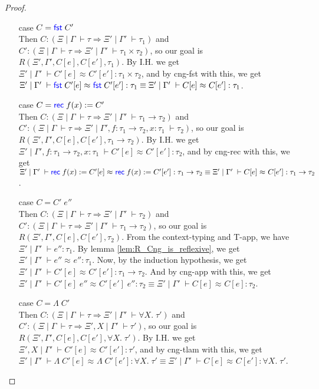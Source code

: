 \documentclass[twoside,11pt,openright]{report}
\theoremstyle{definition}
\newcommand{\Keyword}[1]{{\color{blue} \mathsf{#1}}}
\newcommand{\var}{x}
\newcommand{\expr}{e}
\newcommand{\Fst}{\Keyword{fst}\;}
\newcommand{\Tvar}{X}
\newcommand{\Tlam}{\Lambda\;}
\newcommand{\ctx}{C}
\newcommand{\Tprod}[2]{#1 \times #2}
\newcommand{\Tfunc}[2]{#1 \rightarrow #2}
\newcommand{\Tall}[2]{\forall #1.\; #2}
\newcommand{\typ}{\tau}
\newcommand{\venv}{\Gamma}
\newcommand{\tenv}{\Xi}
\newcommand{\jdg}[4]{#1 \; | \; #2 \; \vdash #3 : #4}
\newcommand{\jdgType}[3]{#1 \; | \; #2 \; \vdash #3}
\newcommand{\jdgRel}[6]{#1 \; | \; #2 \; \vdash #3 \approx^{#4} #5 : #6}
\begin{document}
\begin{proof}
\begin{itemize}
    \item[case] $\ctx = \Fst \ctx'$\\
      Then $\ctx : (\jdgType{\tenv}{\venv}{\typ} \Rightarrow \jdgType{\tenv'}{\venv'}{\typ_1})$ and $\ctx' : (\jdgType{\tenv}{\venv}{\typ} \Rightarrow \jdgType{\tenv'}{\venv'}{\Tprod{\typ_1}{\typ_2}})$, so our goal is $R(\tenv', \venv', \ctx[\expr], \ctx[\expr'], \typ_1)$. By I.H. we get $\jdgRel{\tenv'}{\venv'}{\ctx'[\expr]}{}{\ctx'[\expr']}{\Tprod{\typ_1}{\typ_2}}$, and by cng-fst with this, we get $\jdgRel{\tenv'}{\venv'}{\Fst \ctx'[\expr]}{}{\Fst \ctx'[\expr']}{\typ_1} \equiv \jdgRel{\tenv'}{\venv'}{\ctx[\expr]}{}{\ctx[\expr']}{\typ_1}$.
    \item[case] $\ctx = \Rec f \var := \ctx'$\\
      Then $\ctx : (\jdgType{\tenv}{\venv}{\typ} \Rightarrow \jdgType{\tenv'}{\venv'}{\Tfunc{\typ_1}{\typ_2}})$ and $\ctx' : (\jdgType{\tenv}{\venv}{\typ} \Rightarrow \jdgType{\tenv'}{\venv', f : \Tfunc{\typ_1}{\typ_2}, x : \typ_1}{\typ_2})$, so our goal is $R(\tenv', \venv', \ctx[\expr], \ctx[\expr'], \Tfunc{\typ_1}{\typ_2})$. By I.H. we get $\jdgRel{\tenv'}{\venv', f : \Tfunc{\typ_1}{\typ_2}, x : \typ_1}{\ctx'[\expr]}{}{\ctx'[\expr']}{\typ_2}$, and by cng-rec with this, we get $\jdgRel{\tenv'}{\venv'}{\Rec f x := \ctx'[\expr]}{}{\Rec f x := \ctx'[\expr']}{\Tfunc{\typ_1}{\typ_2}} \equiv \jdgRel{\tenv'}{\venv'}{\ctx[\expr]}{}{\ctx[\expr']}{\Tfunc{\typ_1}{\typ_2}}$.
    \item[case] $\ctx = \ctx' \; \expr''$\\
      Then $\ctx : (\jdgType{\tenv}{\venv}{\typ} \Rightarrow \jdgType{\tenv'}{\venv'}{\typ_2})$ and $\ctx' : (\jdgType{\tenv}{\venv}{\typ} \Rightarrow \jdgType{\tenv'}{\venv'}{\Tfunc{\typ_1}{\typ_2}})$, so our goal is $R(\tenv', \venv', \ctx[\expr], \ctx[\expr'], \typ_2)$. From the context-typing and T-app, we have $\jdg{\tenv'}{\venv'}{\expr''}{\typ_1}$. By lemma \ref{lem:R_Cng_is_reflexive}, we get $\jdgRel{\tenv'}{\venv'}{\expr''}{}{\expr''}{\typ_1}$. Now, by the induction hypothesis, we get $\jdgRel{\tenv'}{\venv'}{\ctx'[\expr]}{}{\ctx'[\expr']}{\Tfunc{\typ_1}{\typ_2}}$. And by cng-app with this, we get $\jdgRel{\tenv'}{\venv'}{\ctx'[\expr] \; \expr''}{}{\ctx'[\expr'] \; \expr''}{\typ_2} \equiv \jdgRel{\tenv'}{\venv'}{\ctx[\expr]}{}{\ctx[\expr]}{\typ_2}$.
    \item[case] $\ctx = \Tlam \ctx'$\\
      Then $\ctx : (\jdgType{\tenv}{\venv}{\typ} \Rightarrow \jdgType{\tenv'}{\venv'}{\Tall{\Tvar}{\typ'}})$ and $\ctx' : (\jdgType{\tenv}{\venv}{\typ} \Rightarrow \jdgType{\tenv', \Tvar}{\venv'}{\typ'})$, so our goal is $R(\tenv', \venv', \ctx[\expr], \ctx[\expr'], \Tall{\Tvar}{\typ'})$. By I.H. we get $\jdgRel{\tenv', \Tvar}{\venv'}{\ctx'[\expr]}{}{\ctx'[\expr']}{\typ'}$, and by cng-tlam with this, we get $\jdgRel{\tenv'}{\venv'}{\Tlam \ctx'[\expr]}{}{\Tlam \ctx'[\expr']}{\Tall{\Tvar}{\typ'}} \equiv \jdgRel{\tenv'}{\venv'}{\ctx[\expr]}{}{\ctx[\expr']}{\Tall{\Tvar}{\typ'}}$.
  \end{itemize}
\end{proof}
\end{document}
